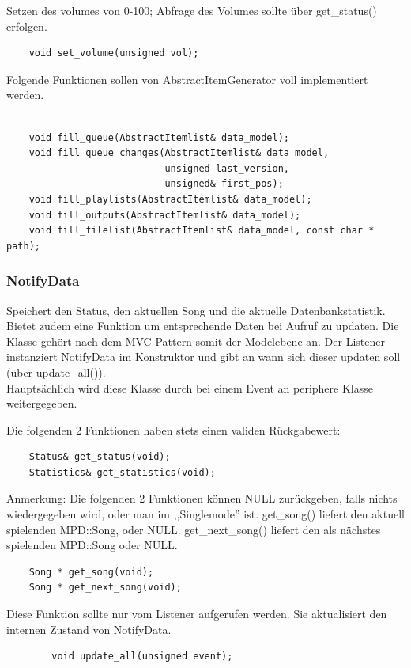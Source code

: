 Setzen des volumes von 0-100; Abfrage des Volumes sollte über get\_status() erfolgen.
\begin{verbatim}
    void set_volume(unsigned vol);
\end{verbatim}

Folgende Funktionen sollen von AbstractItemGenerator voll implementiert werden.    
\begin{verbatim}

    void fill_queue(AbstractItemlist& data_model);
    void fill_queue_changes(AbstractItemlist& data_model,
                            unsigned last_version,
                            unsigned& first_pos);
    void fill_playlists(AbstractItemlist& data_model);
    void fill_outputs(AbstractItemlist& data_model);
    void fill_filelist(AbstractItemlist& data_model, const char * path);
\end{verbatim}

\subsubsection{NotifyData}
Speichert den Status, den aktuellen Song und die aktuelle Datenbankstatistik.
Bietet zudem eine Funktion um entsprechende Daten bei Aufruf zu updaten.
Die Klasse gehört nach dem MVC Pattern somit der Modelebene an.
Der Listener instanziert NotifyData im Konstruktor und gibt an wann sich dieser updaten soll (über update\_all()).
\\        
Hauptsächlich wird diese Klasse durch bei einem Event an periphere Klasse weitergegeben.
      
Die folgenden 2 Funktionen haben stets einen validen Rückgabewert:
\begin{verbatim}
    Status& get_status(void);
    Statistics& get_statistics(void);
\end{verbatim}

Anmerkung: Die folgenden 2 Funktionen können NULL zurückgeben, falls 
nichts wiedergegeben wird, oder man im ,,Singlemode'' ist.
get\_song() liefert den aktuell spielenden MPD::Song, oder NULL.
get\_next\_song() liefert den als nächstes spielenden MPD::Song oder NULL.
\begin{verbatim} 
    Song * get_song(void);
    Song * get_next_song(void);
\end{verbatim}

Diese Funktion sollte nur vom Listener aufgerufen werden. Sie aktualisiert den internen Zustand
von NotifyData.
\begin{verbatim}
        void update_all(unsigned event);
\end{verbatim}



